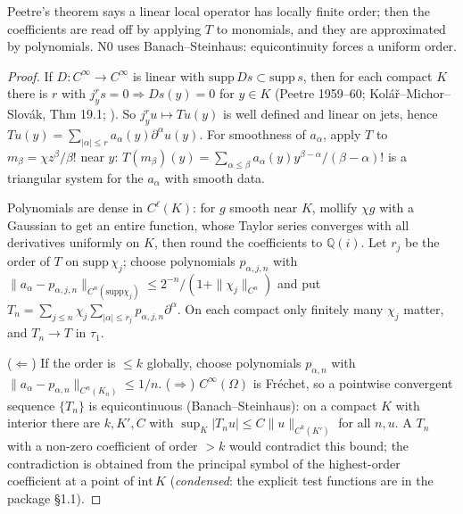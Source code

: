 \begin{proofidea}
Peetre's theorem says a linear local operator has locally finite order; then the coefficients are read off by applying $T$ to monomials, and they are approximated by polynomials. N0 uses Banach--Steinhaus: equicontinuity forces a uniform order.
\end{proofidea}

\begin{proof}
If $D:C^\infty\to C^\infty$ is linear with $\mathrm{supp}\,Ds\subset\mathrm{supp}\,s$, then for each compact $K$ there is $r$ with $j^r_ys=0\Rightarrow Ds(y)=0$ for $y\in K$ (Peetre 1959--60; Kol\'a\v r--Michor--Slov\'ak, Thm 19.1; \cf). So $j^r_yu\mapsto Tu(y)$ is well defined and linear on jets, hence $Tu(y)=\sum_{|\alpha|\le r}a_\alpha(y)\partial^\alpha u(y)$. For smoothness of $a_\alpha$, apply $T$ to $m_\beta=\chi z^\beta/\beta!$ near $y$: $T(m_\beta)(y)=\sum_{\alpha\le\beta}a_\alpha(y)y^{\beta-\alpha}/(\beta-\alpha)!$ is a triangular system for the $a_\alpha$ with smooth data.

Polynomials are dense in $C^\ell(K)$: for $g$ smooth near $K$, mollify $\chi g$ with a Gaussian to get an entire function, whose Taylor series converges with all derivatives uniformly on $K$, then round the coefficients to $\mathbb Q(i)$. Let $r_j$ be the order of $T$ on $\mathrm{supp}\,\chi_j$; choose polynomials $p_{\alpha,j,n}$ with $\|a_\alpha-p_{\alpha,j,n}\|_{C^n(\mathrm{supp}\chi_j)}\le2^{-n}/(1+\|\chi_j\|_{C^n})$ and put $T_n=\sum_{j\le n}\chi_j\sum_{|\alpha|\le r_j}p_{\alpha,j,n}\partial^\alpha$. On each compact only finitely many $\chi_j$ matter, and $T_n\to T$ in $\tau_1$.

($\Leftarrow$) If the order is $\le k$ globally, choose polynomials $p_{\alpha,n}$ with $\|a_\alpha-p_{\alpha,n}\|_{C^n(K_n)}\le1/n$. ($\Rightarrow$) $C^\infty(\Omega)$ is Fr\'echet, so a pointwise convergent sequence $\{T_n\}$ is equicontinuous (Banach--Steinhaus): on a compact $K$ with interior there are $k,K',C$ with $\sup_K|T_nu|\le C\|u\|_{C^k(K')}$ for all $n,u$. A $T_n$ with a non-zero coefficient of order $>k$ would contradict this bound; the contradiction is obtained from the principal symbol of the highest-order coefficient at a point of $\mathrm{int}\,K$ (\emph{condensed}: the explicit test functions are in the package \S1.1).

\end{proof}

